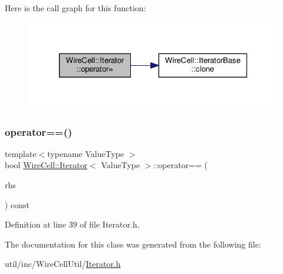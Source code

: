 Here is the call graph for this function\+:
\nopagebreak
\begin{figure}[H]
\begin{center}
\leavevmode
\includegraphics[width=320pt]{class_wire_cell_1_1_iterator_a54ed727bdcc60aeab52fd8bee3feffa1_cgraph}
\end{center}
\end{figure}
\mbox{\label{class_wire_cell_1_1_iterator_a2bbe36ae719997ad6687b968fa7924f0}} 
\subsubsection{\texorpdfstring{operator==()}{operator==()}}
{\footnotesize\ttfamily template$<$typename Value\+Type $>$ \\
bool \hyperlink{class_wire_cell_1_1_iterator}{Wire\+Cell\+::\+Iterator}$<$ Value\+Type $>$\+::operator== (\begin{DoxyParamCaption}\item[{const \hyperlink{class_wire_cell_1_1_iterator}{Iterator}$<$ Value\+Type $>$ \&}]{rhs }\end{DoxyParamCaption}) const\hspace{0.3cm}{\ttfamily [inline]}}



Definition at line 39 of file Iterator.\+h.



The documentation for this class was generated from the following file\+:\begin{DoxyCompactItemize}
\item 
util/inc/\+Wire\+Cell\+Util/\hyperlink{_iterator_8h}{Iterator.\+h}\end{DoxyCompactItemize}
